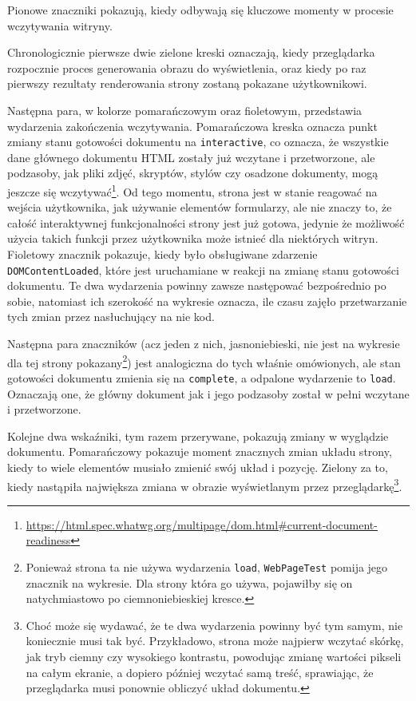 \documentclass[licencjacka]{pracadypl}
\begin{document}
Pionowe znaczniki pokazują, kiedy odbywają się kluczowe momenty w procesie wczytywania witryny. 

Chronologicznie pierwsze dwie zielone kreski oznaczają, kiedy przeglądarka rozpocznie proces generowania obrazu do wyświetlenia, oraz kiedy po raz pierwszy rezultaty renderowania strony zostaną pokazane użytkownikowi. 

Następna para, w kolorze pomarańczowym oraz fioletowym, przedstawia wydarzenia zakończenia wczytywania. Pomarańczowa kreska oznacza punkt zmiany stanu gotowości dokumentu na \texttt{interactive}, co oznacza, że wszystkie dane głównego dokumentu HTML zostały już wczytane i przetworzone, ale podzasoby, jak pliki zdjęć, skryptów, stylów czy osadzone dokumenty, mogą jeszcze się wczytywać\footnote{\url{https://html.spec.whatwg.org/multipage/dom.html\#current-document-readiness}}. Od tego momentu, strona jest w stanie reagować na wejścia użytkownika, jak używanie elementów formularzy, ale nie znaczy to, że całość interaktywnej funkcjonalności strony jest już gotowa, jedynie że możliwość użycia takich funkcji przez użytkownika może istnieć dla niektórych witryn. Fioletowy znacznik pokazuje, kiedy było obsługiwane zdarzenie \texttt{DOMContentLoaded}, które jest uruchamiane w reakcji na zmianę stanu gotowości dokumentu. Te dwa wydarzenia powinny zawsze następować bezpośrednio po sobie, natomiast ich szerokość na wykresie oznacza, ile czasu zajęło przetwarzanie tych zmian przez nasłuchujący na nie kod.

Następna para znaczników (acz jeden z nich, jasnoniebieski, nie jest na wykresie dla tej strony pokazany\footnote{Ponieważ strona ta nie używa wydarzenia \texttt{load}, \texttt{WebPageTest} pomija jego znacznik na wykresie. Dla strony która go używa, pojawiłby się on natychmiastowo po ciemnoniebieskiej kresce.}) jest analogiczna do tych właśnie omówionych, ale stan gotowości dokumentu zmienia się na \texttt{complete}, a odpalone wydarzenie to \texttt{load}. Oznaczają one, że główny dokument jak i jego podzasoby został w pełni wczytane i przetworzone. 

Kolejne dwa wskaźniki, tym razem przerywane, pokazują zmiany w wyglądzie dokumentu. Pomarańczowy pokazuje moment znacznych zmian układu strony, kiedy to wiele elementów musiało zmienić swój układ i pozycję. Zielony za to, kiedy nastąpiła największa zmiana w obrazie wyświetlanym przez przeglądarkę\footnote{Choć może się wydawać, że te dwa wydarzenia powinny być tym samym, nie koniecznie musi tak być. Przykładowo, strona może najpierw wczytać skórkę, jak tryb ciemny czy wysokiego kontrastu, powodując zmianę wartości pikseli na całym ekranie, a dopiero później wczytać samą treść, sprawiając, że przeglądarka musi ponownie obliczyć układ dokumentu.}. %
\end{document}
